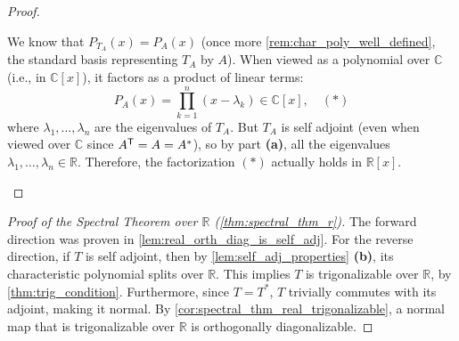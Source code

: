 \begin{proof}
\begin{enumerate}[label=\textbf{(\alph*)}]
    We know that $P_{T_A}(x) = P_A(x)$ (once more \cref{rem:char_poly_well_defined}, the standard basis representing $T_A$ by $A$). When viewed as a polynomial over $\mathbb{C}$ (i.e., in $\mathbb{C}[x]$), it factors as a product of linear terms:
    \[
        P_A(x) = \prod_{k=1}^n (x - \lambda_k) \in \mathbb{C}[x], \quad (*)
    \]
    where $\lambda_1, \dots, \lambda_n$ are the eigenvalues of $T_A$. But $T_A$ is self adjoint (even when viewed over $\mathbb{C}$ since $A^{\mathsf{T}} = A = A^*$), so by part \textbf{(a)}, all the eigenvalues $\lambda_1, \dots, \lambda_n \in \mathbb{R}$. Therefore, the factorization $(*)$ actually holds in $\mathbb{R}[x]$.
\end{enumerate}
\end{proof}

\begin{proof}[Proof of the Spectral Theorem over $\mathbb{R}$ (\cref{thm:spectral_thm_r})]
The forward direction was proven in \cref{lem:real_orth_diag_is_self_adj}. For the reverse direction, if $T$ is self adjoint, then by \cref{lem:self_adj_properties} \textbf{(b)}, its characteristic polynomial splits over $\mathbb{R}$. This implies $T$ is trigonalizable over $\mathbb{R}$, by \cref{thm:trig_condition}. Furthermore, since $T = T^*$, $T$ trivially commutes with its adjoint, making it normal. By \cref{cor:spectral_thm_real_trigonalizable}, a normal map that is trigonalizable over $\mathbb{R}$ is orthogonally diagonalizable.
\end{proof}

